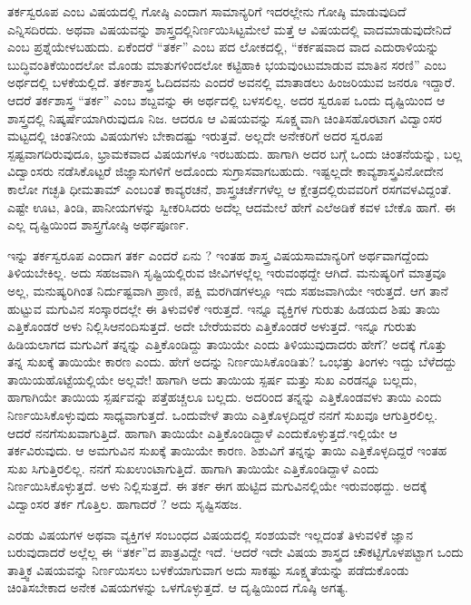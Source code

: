 {ತರ್ಕಸ್ವರೂಪ ಎಂಬ ವಿಷಯದಲ್ಲಿ ಗೋಷ್ಠಿ ಎಂದಾಗ ಸಾಮಾನ್ಯರಿಗೆ ಇದರಲ್ಲೇನು ಗೋಷ್ಠಿ ಮಾಡುವುದಿದೆ ಎನ್ನಿಸದಿರದು. ಅಥವಾ ವಿಷಯವನ್ನು ಶಾಸ್ತ್ರದಲ್ಲಿ\break ನಿರ್ಣಯಿಸಿಟ್ಟಮೇಲೆ ಮತ್ತೆ ಆ ವಿಷಯದಲ್ಲಿ ವಾದಮಾಡುವುದೇನಿದೆ ಎಂಬ ಪ್ರಶ್ನೆಯೇಳಬಹುದು. ಏಕೆಂದರೆ  “ತರ್ಕ” ಎಂಬ ಪದ ಲೋಕದಲ್ಲಿ, “ಕರ್ಕಷವಾದ ವಾದ \enginline{-} ಎದುರಾಳಿಯನ್ನು ಬುದ್ಧಿವಂತಿಕೆಯಿಂದಲೋ ಮೊಂಡು ಮಾತುಗಳಿಂದಲೋ ಕಟ್ಟಿಹಾಕಿ  ಭಯವುಂಟುಮಾಡುವ ಮಾತಿನ ಸರಣಿ” ಎಂಬ ಅರ್ಥದಲ್ಲಿ ಬಳಕೆಯಲ್ಲಿದೆ. ತರ್ಕಶಾಸ್ತ್ರ ಓದಿದವನು ಎಂದರೆ ಅವನಲ್ಲಿ ಮಾತಾಡಲು ಹಿಂಜರಿಯುವ ಜನರೂ ಇದ್ದಾರೆ. ಆದರೆ ತರ್ಕಶಾಸ್ತ್ರ “ತರ್ಕ” ಎಂಬ ಶಬ್ದವನ್ನು ಈ ಅರ್ಥದಲ್ಲಿ ಬಳಸಲಿಲ್ಲ. ಅದರ ಸ್ವರೂಪ ಒಂದು ದೃಷ್ಟಿಯಿಂದ ಆ ಶಾಸ್ತ್ರದಲ್ಲಿ ನಿಷ್ಕರ್ಷೆಯಾಗಿರುವುದೂ ನಿಜ. ಆದರೂ ಆ ವಿಷಯವನ್ನು ಸೂಕ್ಷ್ಮವಾಗಿ ಚಿಂತಿಸಹೊರಟಾಗ ವಿದ್ವಾಂಸರ ಮಟ್ಟದಲ್ಲಿ ಚಿಂತನೀಯ ವಿಷಯಗಳು ಬೇಕಾದಷ್ಟು ಇರುತ್ತವೆ. ಅಲ್ಲದೇ ಅನೇಕರಿಗೆ ಅದರ ಸ್ವರೂಪ ಸ್ಪಷ್ಟವಾಗ\-ದಿರುವುದೂ, ಭ್ರಾಮಕವಾದ ವಿಷಯಗಳೂ ಇರಬಹುದು. ಹಾಗಾಗಿ ಅದರ ಬಗ್ಗೆ ಒಂದು ಚಿಂತನೆಯನ್ನು, ಬಲ್ಲ ವಿದ್ವಾಂಸರು ನಡೆಸಿಕೊಟ್ಟರೆ ಜಿಜ್ಞಾಸುಗಳಿಗೆ ಅದೊಂದು ಸುಗ್ರಾಸವಾಗಬಹುದು. ಇಷ್ಟಲ್ಲದೇ ಕಾವ್ಯಶಾಸ್ತ್ರವಿನೋದೇನ ಕಾಲೋ ಗಚ್ಛತಿ ಧೀಮತಾಮ್ ಎಂಬಂತೆ ಕಾವ್ಯರಚನೆ, ಶಾಸ್ತ್ರಚರ್ಚೆಗಳೆಲ್ಲ ಆ ಕ್ಷೇತ್ರದಲ್ಲಿರುವವರಿಗೆ ರಸಗವಳವಿದ್ದಂತೆ. ಎಷ್ಟೇ ಊಟ, ತಿಂಡಿ, ಪಾನೀಯಗಳನ್ನು ಸ್ವೀಕರಿಸಿದರು ಅದೆಲ್ಲ ಆದಮೇಲೆ ಹೇಗೆ ಎಲೆ\enginline{-}ಅಡಿಕೆ ಕವಳ ಬೇಕೊ ಹಾಗೆ. ಈ ಎಲ್ಲ ದೃಷ್ಟಿಯಿಂದ ಶಾಸ್ತ್ರಗೋಷ್ಠಿ ಅರ್ಥಪೂರ್ಣ.  

ಇನ್ನು ತರ್ಕ\enginline{-}ಸ್ವರೂಪ ಎಂದಾಗ ತರ್ಕ ಎಂದರೆ ಏನು ? ಇಂತಹ ಶಾಸ್ತ್ರ ವಿಷಯ\break ಸಾಮಾನ್ಯರಿಗೆ ಅರ್ಥವಾಗದ್ದೆಂದು ತಿಳಿಯಬೇಕಿಲ್ಲ. ಅದು ಸಹಜವಾಗಿ ಸೃಷ್ಟಿಯಲ್ಲಿರುವ ಜೀವಿಗಳಲ್ಲೆಲ್ಲ ಇರುವಂಥದ್ದೇ ಆಗಿದೆ. ಮನುಷ್ಯರಿಗೆ ಮಾತ್ರವೂ ಅಲ್ಲ, ಮನುಷ್ಯರಿ\-ಗಿಂತ ನಿರ್ದುಷ್ಟವಾಗಿ ಪ್ರಾಣಿ, ಪಕ್ಷಿ ಮರಗಿಡಗಳಲ್ಲೂ ಇದು ಸಹಜವಾಗಿಯೇ ಇರುತ್ತದೆ.  ಆಗ ತಾನೆ ಹುಟ್ಟುವ ಮಗುವಿನ ಸಂಸ್ಕಾರದಲ್ಲೇ ಈ ತಿಳುವಳಿಕೆ ಇರುತ್ತದೆ. ಇನ್ನೂ ವ್ಯಕ್ತಿಗಳ ಗುರುತು ಹಿಡಯದ ಶಿಷು ತಾಯಿ ಎತ್ತಿಕೊಂಡರೆ ಅಳು ನಿಲ್ಲಿಸಿ\break ಆನಂದಿಸುತ್ತದೆ. ಅದೇ ಬೇರೆಯವರು ಎತ್ತಿಕೊಂಡರೆ ಅಳುತ್ತದೆ. ಇನ್ನೂ ಗುರುತು ಹಿಡಿಯ\-ಲಾಗದ ಮಗು\-ವಿಗೆ ತನ್ನನ್ನು ಎತ್ತಿಕೊಂಡಿದ್ದು ತಾಯಿಯೇ ಎಂದು ತಿಳಿಯುವುದಾದರು ಹೇಗೆ? ಅದಕ್ಕೆ ಗೊತ್ತು ತನ್ನ ಸುಖಕ್ಕೆ ತಾಯಿಯೇ ಕಾರಣ ಎಂದು. ಹೇಗೆ ಅದನ್ನು ನಿರ್ಣಯಿಸಿ\-ಕೊಂಡಿತು? ಒಂಭತ್ತು ತಿಂಗಳು ಇದ್ದು ಬೆಳೆದದ್ದು ತಾಯಿಯ\break ಹೊಟ್ಟೆಯಲ್ಲಿಯೇ ಅಲ್ಲವೇ! ಹಾಗಾಗಿ ಅದು ತಾಯಿಯ ಸ್ಪರ್ಷ ಮತ್ತು ಸುಖ ಎರಡನ್ನೂ ಬಲ್ಲದು, ಹಾಗಾಗಿಯೇ ತಾಯಿಯ ಸ್ಪರ್ಷವನ್ನು ಪತ್ತೆಹಚ್ಚಲೂ ಬಲ್ಲದು. ಅದರಿಂದ ತನ್ನನ್ನು ಎತ್ತಿಕೊಂಡವಳು ತಾಯಿ ಎಂದು ನಿರ್ಣಯಿಸಿಕೊಳ್ಳುವುದು ಸಾಧ್ಯವಾಗುತ್ತದೆ. ಒಂದುವೇಳೆ ತಾಯಿ ಎತ್ತಿಕೊಳ್ಳದಿದ್ದರೆ ನನಗೆ ಸುಖವೂ ಆಗುತ್ತಿರಲಿಲ್ಲ. ಆದರೆ ನನಗೆ\break ಸುಖವಾಗುತ್ತಿದೆ. ಹಾಗಾಗಿ ತಾಯಿಯೇ ಎತ್ತಿಕೊಂಡಿದ್ದಾಳೆ ಎಂದುಕೊಳ್ಳುತ್ತದೆ.\break ಇಲ್ಲಿಯೇ ಆ ತರ್ಕವಿರುವುದು. ಆ ಅಮಗುವಿನ ಸುಖಕ್ಕೆ ತಾಯಿಯೇ ಕಾರಣ. ಶಿಶುವಿಗೆ ತನ್ನನ್ನು ತಾಯಿ ಎತ್ತಿಕೊಳ್ಳದಿದ್ದರೆ ಇಂತಹ ಸುಖ ಸಿಗುತ್ತಿರಲಿಲ್ಲ. ನನಗೆ ಸುಖ\break ಉಂಟಾಗುತ್ತಿದೆ. ಹಾಗಾಗಿ ತಾಯಿಯೇ ಎತ್ತಿಕೊಂಡಿದ್ದಾಳೆ ಎಂದು ನಿರ್ಣಯಿಸಿಕೊಳ್ಳುತ್ತದೆ. ಅಳು ನಿಲ್ಲಿಸುತ್ತದೆ. ಈ ತರ್ಕ ಈಗ ಹುಟ್ಟಿದ ಮಗುವಿನಲ್ಲಿಯೇ ಇರುವಂಥದ್ದು. ಅದಕ್ಕೆ ವಿದ್ವಾಂಸರ ತರ್ಕ ಗೊತ್ತಿಲ. ಹಾಗಾದರೆ ? ಅದು ಸೃಷ್ಟಿಸಹಜ. 

ಎರಡು ವಿಷಯಗಳ ಅಥವಾ ವ್ಯಕ್ತಿಗಳ ಸಂಬಂಧದ ವಿಷಯದಲ್ಲಿ ಸಂಶಯವೇ ಇಲ್ಲದಂತೆ ತಿಳುವಳಿಕೆ \enginline{-} ಜ್ಞಾನ ಬರುವುದಾದರೆ ಅಲ್ಲೆಲ್ಲ ಈ “ತರ್ಕ”ದ ಪಾತ್ರವಿದ್ದೇ ಇದೆ. ‘ಆದರೆ ಇದೇ ವಿಷಯ ಶಾಸ್ತ್ರದ ಚೌಕಟ್ಟಿಗೊಳಪಟ್ಟಾಗ ಒಂದು ತಾತ್ತ್ವಿಕ ವಿಷಯವನ್ನು ನಿರ್ಣಯಿಸಲು ಬಳಕೆಯಾಗುವಾಗ ಅದು ಸಾಕಷ್ಟು ಸೂಕ್ಷ್ಮತೆಯನ್ನು ಪಡೆದುಕೊಂಡು  ಚಿಂತಿಸಬೇಕಾದ ಅನೇಕ ವಿಷಯಗಳನ್ನು ಒಳಗೊಳ್ಳುತ್ತದೆ. ಆ ದೃಷ್ಟಿಯಿಂದ ಗೊಷ್ಠಿ ಅಗತ್ಯ. 

}
